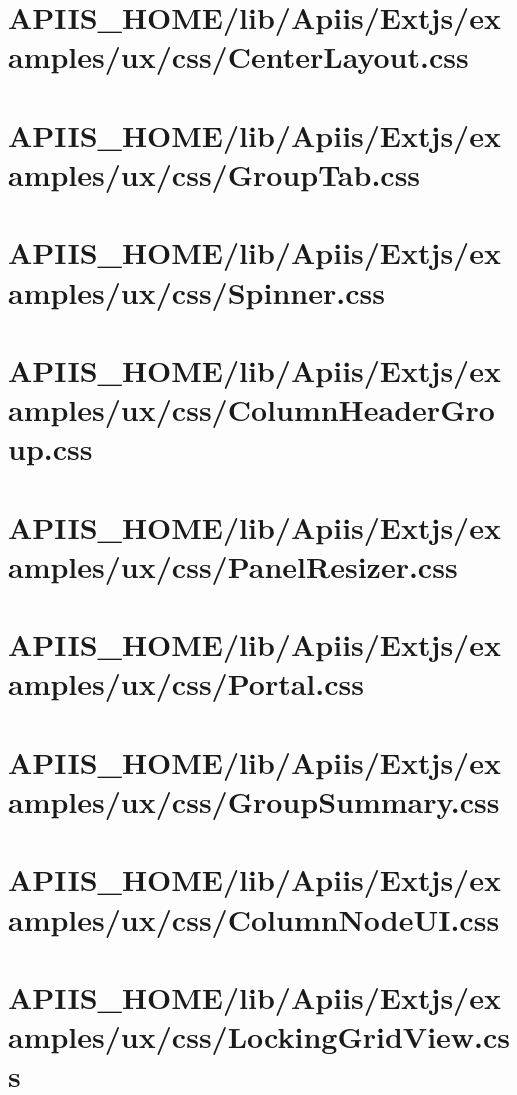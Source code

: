 \section{APIIS\_HOME/lib/Apiis/Extjs/examples/ux/css/CenterLayout.css} 
\section{APIIS\_HOME/lib/Apiis/Extjs/examples/ux/css/GroupTab.css} 
\section{APIIS\_HOME/lib/Apiis/Extjs/examples/ux/css/Spinner.css} 
\section{APIIS\_HOME/lib/Apiis/Extjs/examples/ux/css/ColumnHeaderGroup.css} 
\section{APIIS\_HOME/lib/Apiis/Extjs/examples/ux/css/PanelResizer.css} 
\section{APIIS\_HOME/lib/Apiis/Extjs/examples/ux/css/Portal.css} 
\section{APIIS\_HOME/lib/Apiis/Extjs/examples/ux/css/GroupSummary.css} 
\section{APIIS\_HOME/lib/Apiis/Extjs/examples/ux/css/ColumnNodeUI.css} 
\section{APIIS\_HOME/lib/Apiis/Extjs/examples/ux/css/LockingGridView.css} 
